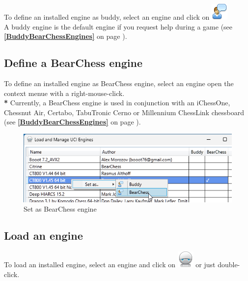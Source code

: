 \documentclass[11pt,a4paper]{article}
\begin{document}
	To define an installed engine as buddy, select an engine and click on \includegraphics[scale=0.5]{user_comment.png}\\
	A buddy engine is the default engine if you request help during a game (see \textbf{\ref{BuddyBearChessEngines}  } on page \pageref{BuddyBearChessEngines}).
	
	
	\subsection{Define a BearChess engine} \label{BearChessEngine}
	
	To define an installed engine as BearChess engine, select an engine open the context menue with a right-mouse-click.\\
	{\color{red}\textbf{*}} Currently, a BearChess engine is used in conjunction with an iChessOne, Chessnut Air, Certabo, TabuTronic Cerno or Millennium ChessLink chessboard (see  \textbf{\ref{BuddyBearChessEngines}  } on page \pageref{BuddyBearChessEngines}).
	
	\begin{figure}[H]
		\centering
		\includegraphics[scale=0.8]{BearChessEngine1.png}
		\caption{Set as BearChess engine}
		\label{fig:BearChessEngine1}
	\end{figure}
	
	
	\subsection{Load an engine}
	
	To load an installed engine, select an engine and click on \includegraphics[scale=0.5]{robot.png} or just double-click.
	
\end{document}
